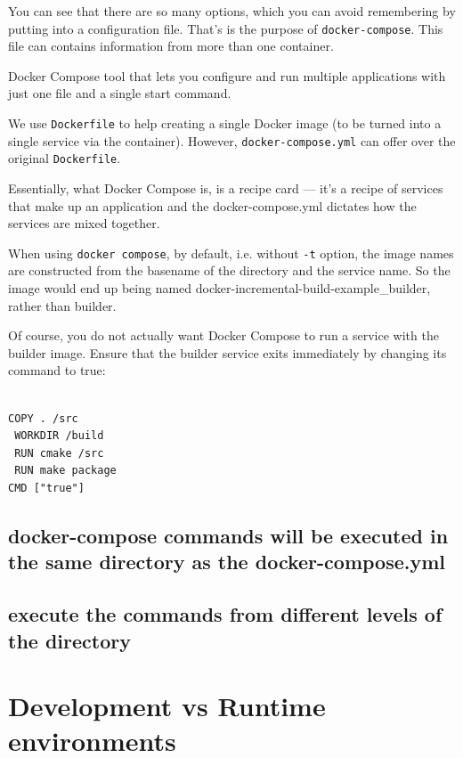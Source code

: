 You can see that there are so many options, which you can avoid remembering by
putting into a configuration file.
That's is the purpose of \verb!docker-compose!. This file can contains
information from more than one container.

Docker Compose tool that lets you configure and run multiple applications with
just one file and a single start command.

We use \verb!Dockerfile! to help creating a single Docker image (to be turned
into a single service via the container). However, \verb!docker-compose.yml! can offer over the
original \verb!Dockerfile!.

Essentially, what Docker Compose is, is a recipe card — it’s a recipe of
services that make up an application and the docker-compose.yml dictates how the
services are mixed together.


When using \verb!docker compose!, by default, i.e. without \verb!-t! option,
the image names are constructed from the basename of the directory and the
service name. So the image would end up being named
docker-incremental-build-example_builder, rather than builder.


Of course, you do not actually want Docker Compose to run a service with the builder image.
Ensure that the builder service exits immediately by changing its command to true:

\begin{verbatim}

COPY . /src
 WORKDIR /build
 RUN cmake /src
 RUN make package
CMD ["true"]

\end{verbatim}



\subsection{docker-compose commands will be executed in the same directory as the docker-compose.yml}



\subsection{execute the commands from different levels of the directory}



\section{Development vs Runtime environments}

